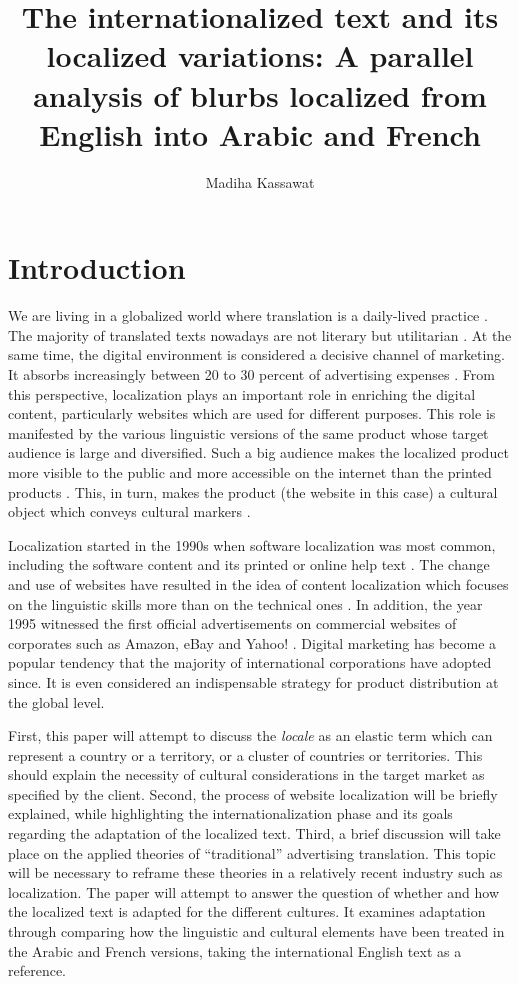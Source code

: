 \documentclass[output=paper]{langsci/langscibook}
\author{Madiha Kassawat\affiliation{Université Sorbonne Nouvelle (ESIT)}}
\title[The internationalized text and its localized variations]{The internationalized text and its localized variations: A parallel analysis of blurbs localized from English into Arabic and French}
\begin{document}
\maketitle

\section{Introduction}

We are living in a globalized world where translation is a daily-lived practice \parencite{ladmiral14}. The majority of translated texts nowadays are not literary but utilitarian \parencite{ledisez04}. At the same time, the digital environment is considered a decisive channel of marketing. It absorbs increasingly between 20 to 30 percent of advertising expenses \parencite{steboulaj14}. From this perspective, localization plays an important role in enriching the digital content, particularly websites which are used for different purposes. This role is manifested by the various linguistic versions of the same product whose target audience is large and diversified. Such a big audience makes the localized product more visible to the public and more accessible on the internet than the printed products \parencite{jimenez13}. This, in turn, makes the product (the website in this case) a cultural object which conveys cultural markers \parencite{remon05}.

Localization started in the 1990s when software localization was most common, including the software content and its printed or online help text \parencite{esselink03}. The change and use of websites have resulted in the idea of content localization which focuses on the linguistic skills more than on the technical ones \parencite{esselink03}. In addition, the year 1995 witnessed the first official advertisements on commercial websites of corporates such as Amazon, eBay and Yahoo! \parencite{steboulaj14}. Digital marketing has become a popular tendency that the majority of international corporations have adopted since. It is even considered an indispensable strategy for product distribution at the global level.

First, this paper will attempt to discuss the \textit{locale} as an elastic term which can represent a country or a territory, or a cluster of countries or territories. This should explain the necessity of cultural considerations in the target market as specified by the client. Second, the process of website localization will be briefly explained, while highlighting the internationalization phase and its goals regarding the adaptation of the localized text. Third, a brief discussion will take place on the applied theories of \enquote{traditional} advertising translation. This topic will be necessary to reframe these theories in a relatively recent industry such as localization. The paper will attempt to answer the question of whether and how the localized text is adapted for the different cultures. It examines adaptation through comparing how the linguistic and cultural elements have been treated in the Arabic and French versions, taking the international English text as a reference.
\end{document}
